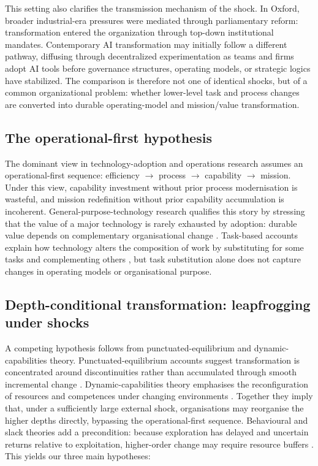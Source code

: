 \documentclass[11pt]{article}
\begin{document}
This setting also clarifies the transmission mechanism of the shock. In Oxford, broader industrial-era pressures were mediated through parliamentary reform: transformation entered the organization through top-down institutional mandates. Contemporary AI transformation may initially follow a different pathway, diffusing through decentralized experimentation as teams and firms adopt AI tools before governance structures, operating models, or strategic logics have stabilized. The comparison is therefore not one of identical shocks, but of a common organizational problem: whether lower-level task and process changes are converted into durable operating-model and mission/value transformation.
\subsection{The operational-first hypothesis}

The dominant view in technology-adoption and operations research assumes an operational-first
sequence: efficiency $\rightarrow$ process $\rightarrow$ capability $\rightarrow$ mission. Under
this view, capability investment without prior process modernisation is wasteful, and mission
redefinition without prior capability accumulation is incoherent. General-purpose-technology
research qualifies this story by stressing that the value of a major technology is rarely
exhausted by adoption: durable value depends on complementary organisational change
\citep{bresnahan1995gpt, david1990dynamo}. Task-based accounts explain how technology alters the
composition of work by substituting for some tasks and complementing others
\citep{autor2003skill}, but task substitution alone does not capture changes in operating models
or organisational purpose.

\subsection{Depth-conditional transformation: leapfrogging under shocks}

A competing hypothesis follows from punctuated-equilibrium and dynamic-capabilities theory.
Punctuated-equilibrium accounts suggest transformation is concentrated around discontinuities
rather than accumulated through smooth incremental change \citep{romanelli1994punctuated}.
Dynamic-capabilities theory emphasises the reconfiguration of resources and competences under
changing environments \citep{teece1997dynamic}. Together they imply that, under a sufficiently
large external shock, organisations may reorganise the higher depths directly, bypassing the
operational-first sequence. Behavioural and slack theories add a precondition: because
exploration has delayed and uncertain returns relative to exploitation, higher-order change may
require resource buffers \citep{march1991exploration, cyert1963behavioral, bourgeois1981slack}.
This yields our three main hypotheses:
\end{document}
